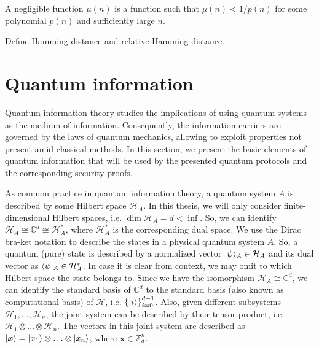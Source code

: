 A negligible function $\mu(n)$ is a function such that $\mu(n) < 1/p(n)$ for some polynomial $p(n)$ and sufficiently large $n$.

{\cv Define Hamming distance and relative Hamming distance.}


\section{Quantum information}

Quantum information theory studies the implications of using quantum systems as the medium of information. Consequently, the information carriers are governed by the laws of quantum mechanics, allowing to exploit properties not present amid classical methods. In this section, we present the basic elements of quantum information that will be used by the presented quantum protocols and the corresponding security proofs.

As common practice in quantum information theory, a quantum system $A$ is described by some Hilbert space $\mathcal{H}_A$. In this thesis, we will only consider finite-dimensional Hilbert spaces, i.e. $\dim \mathcal{H}_A = d < \inf$. So, we can identify $\mathcal{H}_A \cong \mathbb{C}^d \cong \mathcal{H}^{*}_A$, where $\mathcal{H}^{*}_A$ is the corresponding dual space. We use the Dirac bra-ket notation to describe the states in a physical quantum system $A$. So, a quantum (pure) state is described by a normalized vector $| \psi \rangle_A\in\mathcal{H}_A$ and its dual vector as $\langle \psi |_A\in\mathcal{H}^{*}_A$. In case it is clear from context, we may omit to which Hilbert space the state belongs to. Since we have the isomorphism $\mathcal{H}_A \cong \mathbb{C}^d$, we can identify the standard basis of $\mathbb{C}^d$ to the standard basis (also known as computational basis) of $\mathcal{H}$, i.e. $\left\{ | i \rangle \right\}_{i=0}^{d-1}$. Also, given different subsystems $\mathcal{H}_1, \ldots, \mathcal{H}_n$, the joint system can be described by their tensor product, i.e. $\mathcal{H}_1 \otimes \ldots \otimes \mathcal{H}_n$. The vectors in this joint system are described as $| \bm{x} \rangle = | x_1 \rangle \otimes \ldots \otimes | x_n \rangle$, where $\bm{x} \in \mathbb{Z}_d^n$.

